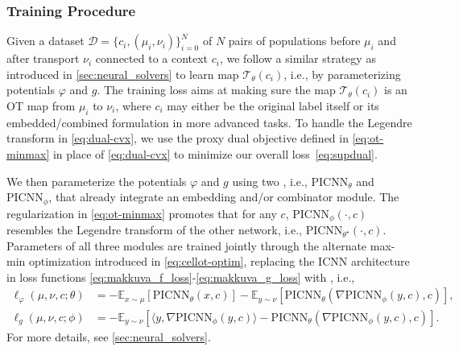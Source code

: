 \subsubsection{Training Procedure}

 Given a dataset $\mathcal{D}=\{c_i, (\mu_i, \nu_i) \}_{i=0}^N$ of $N$ pairs of populations before $\mu_i$ and after transport $\nu_i$ connected to a context $c_i$, we follow a similar strategy as introduced in \cref{sec:neural_solvers} to learn map $\mathcal{T}_\theta(c_i)$, i.e., by parameterizing potentials $\varphi$ and $g$. 
The training loss aims at making sure the map $\mathcal{T}_\theta(c_i)$ is an \acrshort{OT} map from $\mu_i$ to $\nu_i$, where $c_i$ may either be the original label itself or its embedded/combined formulation in more advanced tasks. To handle the Legendre transform in \eqref{eq:dual-cvx}, we use the proxy dual objective defined in \eqref{eq:ot-minmax} \citep{makkuva2020optimal} in place of \eqref{eq:dual-cvx} to minimize our overall loss~\eqref{eq:supdual}.

We then parameterize the potentials $\varphi$ and $g$ using two , i.e., $\text{PICNN}_{\theta}$ and $\text{PICNN}_{\phi}$, that already integrate an embedding and/or combinator module. The regularization in \eqref{eq:ot-minmax} promotes that for any $c$, $\text{PICNN}_{\phi}(\cdot,c)$ resembles the Legendre transform of the other network, i.e., $\text{PICNN}_{\theta^\star}(\cdot,c)$.
Parameters of all three modules are trained jointly through the alternate max-min optimization introduced in \eqref{eq:cellot-optim}, replacing the \acrshort{ICNN} architecture in loss functions \eqref{eq:makkuva_f_loss}-\eqref{eq:makkuva_g_loss} with , i.e.,
\begin{align*} 
    \ell_\varphi(\mu, \nu, c; \theta) &= -\mathbb{E}_{x \sim \mu}[\text{PICNN}_{\theta}(x, c)] - \mathbb{E}_{y \sim \nu}[\text{PICNN}_{\theta}(\nabla \text{PICNN}_{\phi}(y, c), c)], \\
    \ell_g(\mu, \nu, c; \phi) &= -\mathbb{E}_{y \sim \nu}[\langle y, \nabla \text{PICNN}_{\phi}(y, c)\rangle-\text{PICNN}_{\theta}(\nabla \text{PICNN}_{\phi}(y, c), c)].
\end{align*}
For more details, see \cref{sec:neural_solvers}.

